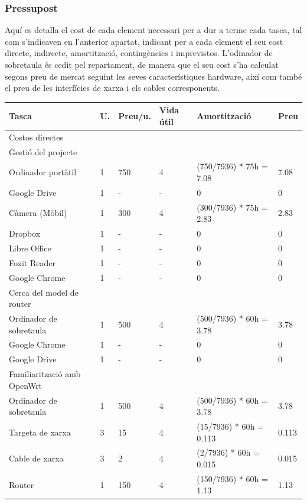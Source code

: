 \documentclass[11pt]{article}
\begin{document}
\subsubsection{Pressupost}
Aquí es detalla el cost de cada element necessari per a dur a terme cada tasca, tal com s’indicaven en l’anterior apartat, indicant per a cada element el seu cost directe, indirecte, amortització, contingències i imprevistos. L’odinador de sobretaula és cedit pel repartament, de manera que el seu cost s’ha calculat segons preu de mercat seguint les seves característiques hardware, així com també el preu de les interfícies de xarxa i els cables corresponents.
\begin{center}
	\begin{tabular}{| l | l | l | l | l | l |}
		\hline
		Tasca & U. & Preu/u. & Vida útil & Amortització & Preu \\ \hline
		Costos directes & & & & & \\ \hline
		Gestió del projecte & & & & & \\ \hline
		Ordinador portàtil & 1 & 750 & 4 & (750/7936) * 75h = 7.08 & 7.08 \\ \hline
		Google Drive & 1 & - & - & 0 & 0 \\ \hline
		Càmera (Mòbil) & 1 & 300 & 4 & (300/7936) * 75h = 2.83 & 2.83 \\ \hline
		Dropbox & 1 & - & - & 0 & 0 \\ \hline
		Libre Office & 1 & - & - & 0 & 0 \\ \hline
		Foxit Reader & 1 & - & - & 0 & 0 \\ \hline
		Google Chrome & 1 & - & - & 0 & 0 \\ \hline
		Cerca del model de router & & & & & \\ \hline
		Ordinador de sobretaula & 1 & 500 & 4 & (500/7936) * 60h = 3.78 & 3.78 \\ \hline
		Google Chrome & 1 & - & - & 0 & 0 \\ \hline
		Google Drive & 1 & - & - & 0 & 0 \\ \hline
		Familiarització amb OpenWrt & & & & & \\ \hline
		Ordinador de sobretaula & 1 & 500 & 4 & (500/7936) * 60h = 3.78 & 3.78 \\ \hline
		Targeta de xarxa & 3 & 15 & 4 & (15/7936) * 60h = 0.113 & 0.113 \\ \hline
		Cable de xarxa & 3 & 2 & 4 & (2/7936) * 60h = 0.015 & 0.015 \\ \hline
		Router & 1 & 150 & 4 & (150/7936) * 60h = 1.13 & 1.13 \\ \hline

\end{tabular}
\end{center}
\end{document}
